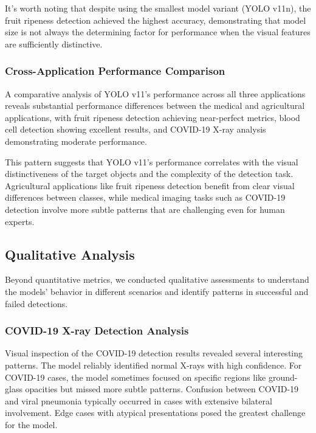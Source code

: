 \begin{multicols}{2}
It's worth noting that despite using the smallest model variant (YOLO v11n), the fruit ripeness detection achieved the highest accuracy, demonstrating that model size is not always the determining factor for performance when the visual features are sufficiently distinctive.

\subsubsection{Cross-Application Performance Comparison}

A comparative analysis of YOLO v11's performance across all three applications reveals substantial performance differences between the medical and agricultural applications, with fruit ripeness detection achieving near-perfect metrics, blood cell detection showing excellent results, and COVID-19 X-ray analysis demonstrating moderate performance.

This pattern suggests that YOLO v11's performance correlates with the visual distinctiveness of the target objects and the complexity of the detection task. Agricultural applications like fruit ripeness detection benefit from clear visual differences between classes, while medical imaging tasks such as COVID-19 detection involve more subtle patterns that are challenging even for human experts.

\subsection{Qualitative Analysis}

Beyond quantitative metrics, we conducted qualitative assessments to understand the models' behavior in different scenarios and identify patterns in successful and failed detections.

\subsubsection{COVID-19 X-ray Detection Analysis}

Visual inspection of the COVID-19 detection results revealed several interesting patterns. The model reliably identified normal X-rays with high confidence. For COVID-19 cases, the model sometimes focused on specific regions like ground-glass opacities but missed more subtle patterns. Confusion between COVID-19 and viral pneumonia typically occurred in cases with extensive bilateral involvement. Edge cases with atypical presentations posed the greatest challenge for the model.


\end{multicols}
